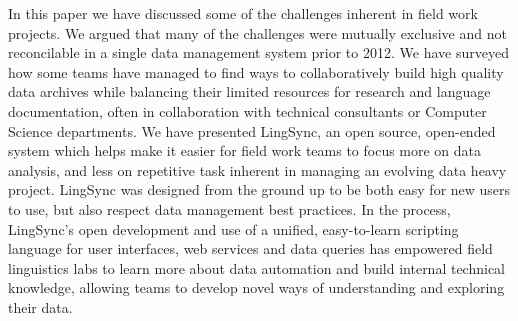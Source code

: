 \documentclass[letterpaper, 12pt, dvips]{mitwpl}
\begin{document}
In this paper we have discussed some of the challenges inherent in field work projects. 
We argued that many of the challenges were mutually exclusive and not reconcilable in a single data management system prior to 2012. 
We have surveyed how some teams have managed to find ways to collaboratively build high quality data archives while balancing  their limited resources for research and language documentation, often in collaboration with technical consultants or Computer Science departments. 
We have presented LingSync, an open source, open-ended system which helps make it easier for field work teams to focus more on data analysis,  and less on 
 repetitive task inherent in managing an evolving data heavy project. 
LingSync was designed from the ground up to be both easy for new users to use, but also respect data management best practices. In the process, LingSync's open development and use of a unified, easy-to-learn scripting language for user interfaces, web services and data queries has empowered field linguistics labs to learn more about data automation and build internal technical knowledge, allowing teams to develop novel ways of understanding and exploring their data. %




\custombib{}
\end{document}
